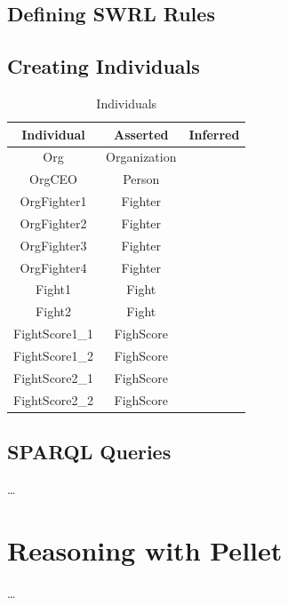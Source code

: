 \documentclass[a4paper]{article}
\begin{document}
\subsection{Defining SWRL Rules}

\subsection{Creating Individuals}

\begin{table}[H]
	\centering
	\begin{tabular}{|c|c|c|}
		\hline
		\textbf{Individual} & \textbf{Asserted} & \textbf{Inferred} \\
		\hline
		Org & Organization & \\
		\hline
		OrgCEO & Person & \\
		\hline
		OrgFighter1 & Fighter & \\
		\hline
		OrgFighter2 & Fighter & \\
		\hline
		OrgFighter3 & Fighter & \\
		\hline
		OrgFighter4 & Fighter & \\
		\hline
		Fight1 & Fight & \\
		\hline
		Fight2 & Fight & \\
		\hline
		FightScore1\_1 & FighScore & \\
		\hline
		FightScore1\_2 & FighScore & \\
		\hline
		FightScore2\_1 & FighScore & \\
		\hline
		FightScore2\_2 & FighScore & \\
		\hline
	\end{tabular}
	\caption{Individuals}
	\label{tab:individuals}
\end{table}

\subsection{SPARQL Queries}
\ldots

\section{Reasoning with Pellet}
\ldots
\end{document}
